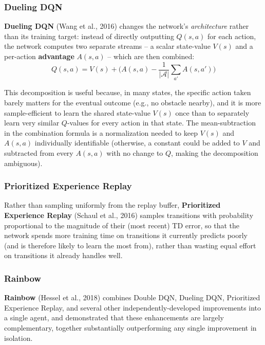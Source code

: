 \documentclass[12pt,a4paper]{article}
\begin{document}
\subsubsection{Dueling DQN}

\textbf{Dueling DQN} (Wang et al., 2016) changes the network's \emph{architecture} rather than its training target: instead of directly outputting $Q(s,a)$ for each action, the network computes two separate streams -- a scalar state-value $V(s)$ and a per-action \textbf{advantage} $A(s,a)$ -- which are then combined:
\[
Q(s,a) = V(s) + \Big(A(s,a) - \frac{1}{|\mathcal{A}|}\sum_{a'} A(s,a')\Big)
\]

\begin{keyidea}
This decomposition is useful because, in many states, the specific action taken barely matters for the eventual outcome (e.g., no obstacle nearby), and it is more sample-efficient to learn the shared state-value $V(s)$ once than to separately learn very similar $Q$-values for every action in that state. The mean-subtraction in the combination formula is a normalization needed to keep $V(s)$ and $A(s,a)$ individually identifiable (otherwise, a constant could be added to $V$ and subtracted from every $A(s,a)$ with no change to $Q$, making the decomposition ambiguous).
\end{keyidea}

\subsubsection{Prioritized Experience Replay}

Rather than sampling uniformly from the replay buffer, \textbf{Prioritized Experience Replay} (Schaul et al., 2016) samples transitions with probability proportional to the magnitude of their (most recent) TD error, so that the network spends more training time on transitions it currently predicts poorly (and is therefore likely to learn the most from), rather than wasting equal effort on transitions it already handles well.

\subsubsection{Rainbow}

\textbf{Rainbow} (Hessel et al., 2018) combines Double DQN, Dueling DQN, Prioritized Experience Replay, and several other independently-developed improvements into a single agent, and demonstrated that these enhancements are largely complementary, together substantially outperforming any single improvement in isolation.
\end{document}
